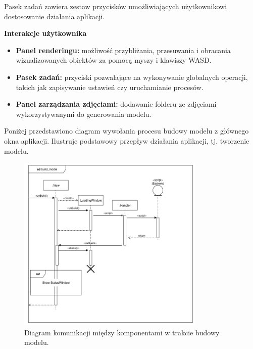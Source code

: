 Pasek zadań zawiera zestaw przycisków umożliwiających użytkownikowi dostosowanie działania aplikacji. 

\textbf{Interakcje użytkownika}
\begin{itemize}
    \item \textbf{Panel renderingu:} możliwość przybliżania, przesuwania i obracania wizualizowanych obiektów za pomocą myszy i klawiszy WASD.
    \item \textbf{Pasek zadań:} przyciski pozwalające na wykonywanie globalnych operacji, takich jak zapisywanie ustawień czy uruchamianie procesów.
    \item \textbf{Panel zarządzania zdjęciami:} dodawanie folderu ze zdjęciami wykorzystywanymi do generowania modelu.
\end{itemize}

Poniżej przedstawiono diagram wywołania procesu budowy modelu z głównego okna aplikacji. Ilustruje podstawowy przepływ działania aplikacji, tj. tworzenie modelu.

\begin{figure}[h!]
    \centering
    \includegraphics[width=0.8\textwidth]{img/diagramy/diagram_sekw_build.png}
    \caption{Diagram komunikacji między komponentami w trakcie budowy modelu.}
\end{figure}

